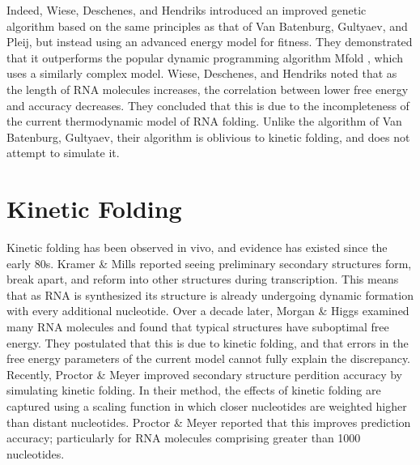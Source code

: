 \documentclass{cshonours}
\begin{document}
Indeed, Wiese, Deschenes, and Hendriks \cite{wiese2008rnapredict} introduced an improved
genetic algorithm based on the same principles as that of Van Batenburg, Gultyaev,
and Pleij, but instead using an advanced energy model for fitness. They demonstrated that it outperforms the popular dynamic programming algorithm
Mfold \cite{zuker2003mfold}, which uses a similarly complex model. Wiese, Deschenes, and Hendriks noted that as the length of RNA molecules increases, the correlation between lower free energy and accuracy decreases. They concluded that this is due to the incompleteness of the current thermodynamic model of RNA folding. Unlike the algorithm of Van Batenburg, Gultyaev, their algorithm is oblivious to kinetic folding, and does not attempt to simulate it.

\section{Kinetic Folding}
Kinetic folding has been observed in vivo, and evidence has existed since the early 80s. Kramer \& Mills \cite{kramer1981secondary} reported seeing preliminary secondary structures form, break apart, and reform into other structures during transcription. This means that as RNA is synthesized its structure is already undergoing dynamic formation with every additional nucleotide. Over a decade later, Morgan \& Higgs \cite{morgan1996evidence} examined many RNA molecules and found that typical structures have suboptimal free energy. They postulated that this is due to kinetic folding, and that errors in the free energy parameters of the current model cannot fully explain the discrepancy. Recently, Proctor \& Meyer \cite{proctor2013cofold} improved secondary structure perdition accuracy by simulating kinetic folding. In their method, the effects of kinetic folding are captured using a scaling function in which closer nucleotides are weighted higher than distant nucleotides. Proctor \& Meyer \cite{proctor2013cofold} reported that this improves prediction accuracy; particularly for RNA molecules comprising greater than 1000 nucleotides. 
\end{document}
